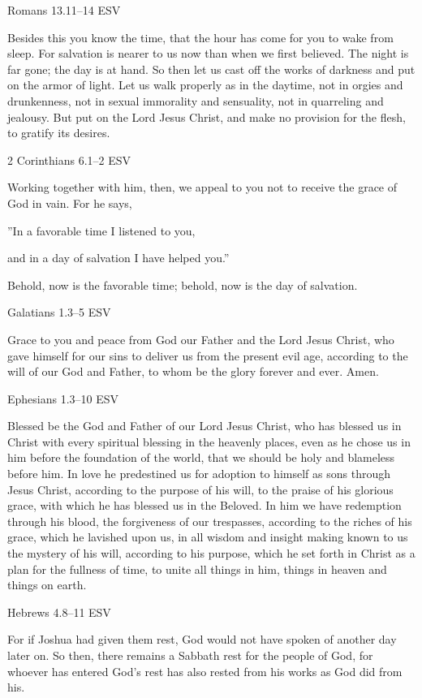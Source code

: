 \documentclass[
]{article}
\newcommand{\RL}[1]{\beginR #1\endR}
\begin{document}
Romans 13.11--14 ESV

Besides this you know the time, that the hour has come for you to wake
from sleep. For salvation is nearer to us now than when we first
believed. The night is far gone; the day is at hand. So then let us cast
off the works of darkness and put on the armor of light. Let us walk
properly as in the daytime, not in orgies and drunkenness, not in sexual
immorality and sensuality, not in quarreling and jealousy. But put on
the Lord Jesus Christ, and make no provision for the flesh, to gratify
its desires.

2 Corinthians 6.1--2 ESV

Working together with him, then, we appeal to you not to receive the
grace of God in vain. For he says,

\RL{''}In a favorable time I listened to you,

and in a day of salvation I have helped you.''

Behold, now is the favorable time; behold, now is the day of salvation.

Galatians 1.3--5 ESV

Grace to you and peace from God our Father and the Lord Jesus Christ,
who gave himself for our sins to deliver us from the present evil age,
according to the will of our God and Father, to whom be the glory
forever and ever. Amen.

Ephesians 1.3--10 ESV

Blessed be the God and Father of our Lord Jesus Christ, who has blessed
us in Christ with every spiritual blessing in the heavenly places, even
as he chose us in him before the foundation of the world, that we should
be holy and blameless before him. In love he predestined us for adoption
to himself as sons through Jesus Christ, according to the purpose of his
will, to the praise of his glorious grace, with which he has blessed us
in the Beloved. In him we have redemption through his blood, the
forgiveness of our trespasses, according to the riches of his grace,
which he lavished upon us, in all wisdom and insight making known to us
the mystery of his will, according to his purpose, which he set forth in
Christ as a plan for the fullness of time, to unite all things in him,
things in heaven and things on earth.

Hebrews 4.8--11 ESV

For if Joshua had given them rest, God would not have spoken of another
day later on. So then, there remains a Sabbath rest for the people of
God, for whoever has entered God\RL{'}s rest has also rested from his
works as God did from his.
\end{document}
